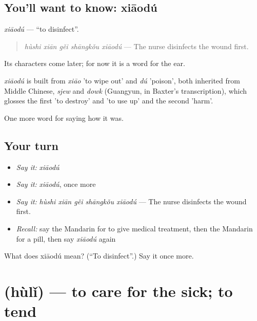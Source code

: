 \subsection*{You'll want to know: xiāodú}
\emph{xiāodú} — \textquotedblleft{}to disinfect\textquotedblright{}.

\begin{quote}
\emph{hùshi xiān gěi shāngkǒu xiāodú} — The nurse disinfects the wound first.
\end{quote}

Its characters come later; for now it is a word for the ear.

\begin{cousinweb}
\emph{xiāodú} is built from \emph{xiāo} 'to wipe out' and \emph{dú} 'poison', both inherited from Middle Chinese, \emph{sjew} and \emph{dowk} (Guangyun, in Baxter's transcription), which glosses the first 'to destroy' and 'to use up' and the second 'harm'.
\end{cousinweb}

\begin{grammarlens}[title={What you've built}]
One more word for saying how it was.
\end{grammarlens}

\subsection*{Your turn}
\begin{itemize}
\raggedright
  \item \emph{Say it:} \emph{xiāodú}
  \item \emph{Say it:} \emph{xiāodú}, once more
  \item \emph{Say it:} \emph{hùshi xiān gěi shāngkǒu xiāodú} — The nurse disinfects the wound first.
  \item \emph{Recall:} say the Mandarin for to give medical treatment, then the Mandarin for a pill, then say \emph{xiāodú} again
\end{itemize}

\begin{tcolorbox}[breakable,colback=teal!4,colframe=teal!35!black,title={Before you move on}]
What does xiāodú mean? (\textquotedblleft{}To disinfect\textquotedblright{}.) Say it once more.
\end{tcolorbox}
\section[\texorpdfstring{\zh{护理} (hùlǐ)}{护理 (hùlǐ)}]{ (hùlǐ) — to care for the sick; to tend}

